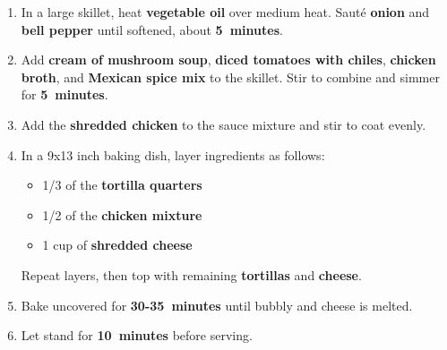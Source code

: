 \documentclass[11pt,letterpaper]{article}
\begin{document}
\begin{enumerate}
    \item In a large skillet, heat \textbf{vegetable oil} over medium heat. Sauté \textbf{onion} and \textbf{bell pepper} until softened, about \textbf{5~minutes}.
    
    \item Add \textbf{cream of mushroom soup}, \textbf{diced tomatoes with chiles}, \textbf{chicken broth}, and \textbf{Mexican spice mix} to the skillet. Stir to combine and simmer for \textbf{5~minutes}.
    
    \item Add the \textbf{shredded chicken} to the sauce mixture and stir to coat evenly.
    
    \item In a 9x13 inch baking dish, layer ingredients as follows:
    \begin{itemize}
        \item 1/3 of the \textbf{tortilla quarters}
        \item 1/2 of the \textbf{chicken mixture}
        \item 1 cup of \textbf{shredded cheese}
    \end{itemize}
    Repeat layers, then top with remaining \textbf{tortillas} and \textbf{cheese}.
    
    \item Bake uncovered for \textbf{30-35~minutes} until bubbly and cheese is melted.
    
    \item Let stand for \textbf{10~minutes} before serving.
\end{enumerate}
\end{document}
